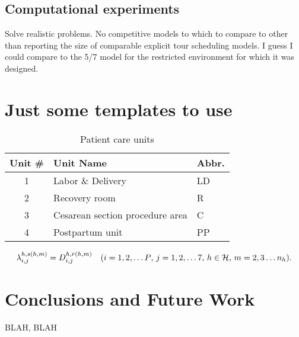 \documentclass{article}
\begin{document}
\subsection{Computational experiments}
\label{sec-computational}

Solve realistic problems. No competitive models to which to compare to other than reporting the size of comparable explicit tour scheduling models. I guess I could compare to the 5/7 model for the restricted environment for which it was designed.

\section{Just some templates to use}


\begin{table}
  \centering
  \caption{Patient care units}\label{table:units}
\begin{tabular}{cll}\hline
 Unit \#       & Unit Name    & Abbr.   \\ \hline
  1       & Labor \& Delivery    & LD    \\
  2       & Recovery room   & R    \\
  3       & Cesarean section procedure area    & C    \\
  4       & Postpartum unit    & PP   \\ \hline  
\end{tabular}
\end{table}



\begin{equation}
\label{eqn:flowcons}
\lambda_{i,j}^{h,s(h,m)}=D_{i,j}^{h,r(h,m)} \quad \text{($i=1,2,\ldots P$, $j=1,2,\ldots 7$, $h \in {\cal H}$, $m=2,3\ldots n_{h}$).}
\end{equation}
\section{Conclusions and Future Work}
\label{sec-conclusions}


BLAH, BLAH








%
\end{document}
